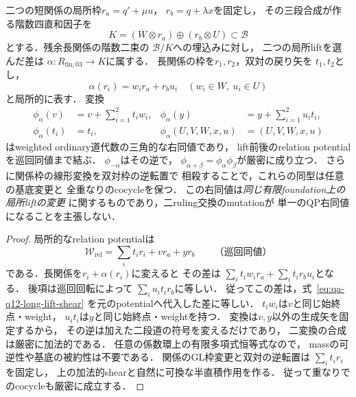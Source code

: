 \begin{lemma}[残余長関係の局所lift変更は厳密な右同値で貼り合う]
\label{lem:qa-q12-long-relation-lift-shear}
二つの短関係の局所枠$r_a=q'+\mu u$，
$r_b=q+\lambda x$を固定し，
その三段合成が作る階数四直和因子を
\[
 K=(W\otimes r_a)\oplus(r_b\otimes U)
       \subset\mathcal B
\]
とする．残余長関係の階数二束の
$\mathcal B/K$への埋込みに対し，
二つの局所liftを選んだ差は
$\alpha:R_{{\mathrm{fin}},03}\to K$に属する．
長関係の枠を$r_1,r_2$，双対の戻り矢を
$t_1,t_2$とし，
\[
 \alpha(r_i)=w_i r_a+r_b u_i
 \quad(w_i\in W,\ u_i\in U)
\]
と局所的に表す．
変換
\[
 \begin{aligned}
  \phi_\alpha(v)&=v+\sum_{i=1}^2t_iw_i,&
  \phi_\alpha(y)&=y+\sum_{i=1}^2u_it_i,\\
  \phi_\alpha(t_i)&=t_i,&
  \phi_\alpha(U,V,W,x,u)&=(U,V,W,x,u)
 \end{aligned}
 \tag{LS}\label{eq:qa-q12-long-lift-shear}
\]
はweighted ordinary道代数の三角的な右同値であり，
lift前後のrelation potentialを巡回同値まで結ぶ．
$\phi_{-\alpha}$はその逆で，
$\phi_{\alpha+\beta}=\phi_\alpha\phi_\beta$が厳密に成り立つ．
さらに関係枠の線形変換を双対枠の逆転置で
相殺することで，これらの同型は任意の基底変更と
全重なりのcocycleを保つ．
この右同値は\emph{同じ有限foundation上の局所liftの変更}
に関するものであり，二ruling交換のmutationが
単一のQP右同値になることを主張しない．
\end{lemma}
\begin{proof}
局所的なrelation potentialは
\[
 \mathcal W_{\mathrm{rel}}
   =\sum_i t_i r_i+v r_a+y r_b
 \qquad\text{（巡回同値）}
\]
である．長関係を$r_i+\alpha(r_i)$に変えると
その差は
$\sum_i t_iw_i r_a+\sum_i t_i r_bu_i$となる．
後項は巡回回転によって
$\sum_i u_it_i r_b$に等しい．
従ってこの差は，式~\eqref{eq:qa-q12-long-lift-shear}
を元のpotentialへ代入した差に等しい．
$t_iw_i$は$v$と同じ始終点・weight，
$u_it_i$は$y$と同じ始終点・weightを持つ．
変換は$v,y$以外の生成矢を固定するから，
その逆は加えた二段道の符号を変えるだけであり，
二変換の合成は厳密に加法的である．
任意の係数環上の有限多項式恒等式なので，
massの可逆性や基底の被約性は不要である．
関係のGL枠変更と双対の逆転置は
$\sum_i t_ir_i$を固定し，
上の加法的shearと自然に可換な半直積作用を作る．
従って重なりでのcocycleも厳密に成立する．
\end{proof}

